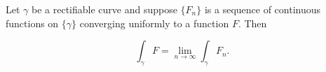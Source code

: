 Let $\gamma$ be a rectifiable curve and suppose $\{F_n\}$ is a sequence of continuous functions on $\{\gamma\}$ converging uniformly to a function $F$. Then

$$\int_{\gamma} F = \lim_{n \to \infty} \int_{\gamma} F_n.$$
